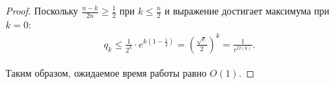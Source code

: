 \begin{proof}
	Поскольку $\frac{n-k}{2n} \geq \frac{1}{2}$ при $k \leq \frac{n}{2}$ и выражение достигает максимума при $k = 0$:
	\begin{align*}
		q_k
		\leq \frac{1}{2^k} \cdot e^{k\!\left(1 - \frac{1}{2}\right)}
		= \left(\frac{\sqrt{e}}{2}\right)^{\!k}
		= \frac{1}{e^{\Omega(k)}}.
	\end{align*}
	
	Таким образом, ожидаемое время работы равно $O(1)$.
\end{proof}